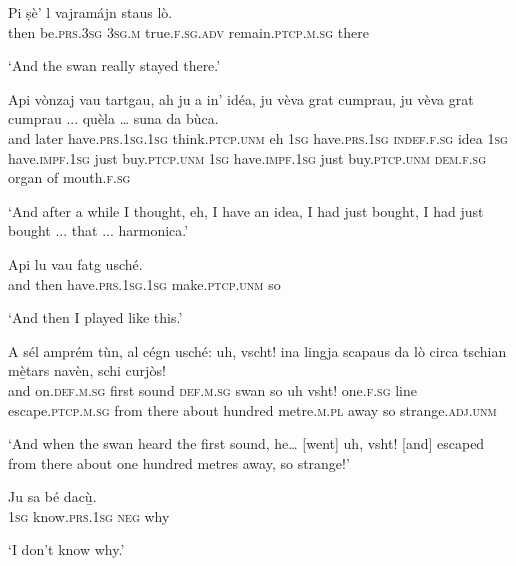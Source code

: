 \begin{linenumbers}
\gll   Pi ṣè’ l vajramájn staus lò. \\
then be.\textsc{prs.3sg} \textsc{3sg.m} true.\textsc{f.sg.adv} remain.\textsc{ptcp.m.sg} there\\
\end{linenumbers}
\medskip
\glt `And the swan really stayed there.'
\medskip

\begin{linenumbers}
\gll Api vònzaj vau tartgau, ah ju a in’ idéa, ju vèva grat cumprau, ju vèva grat cumprau ... quèla … suna da bùca.   \\
and later have.\textsc{prs.1sg.1sg} think.\textsc{ptcp.unm} eh \textsc{1sg} have.\textsc{prs.1sg} \textsc{indef.f.sg} idea \textsc{1sg} have.\textsc{impf.1sg} just buy.\textsc{ptcp.unm}  \textsc{1sg} have.\textsc{impf.1sg} just buy.\textsc{ptcp.unm} {} \textsc{dem.f.sg} {} organ of mouth.\textsc{f.sg} \\
\end{linenumbers}
\medskip
\glt `And after a while I thought, eh, I have an idea, I had just bought, I had just bought ... that ... harmonica.'
\medskip

\begin{linenumbers}
\gll  Api lu vau fatg usché.\footnotemark  \\
and then have.\textsc{prs.1sg.1sg} make.\textsc{ptcp.unm} so \\
\end{linenumbers}
\medskip
\glt `And then I played like this.'
\medskip

\begin{linenumbers}
\gll  A sél amprém tùn, al cégn usché: uh, vscht! ina lingja scapaus da lò circa tschian mè̱tars navèn, schi curjòs!  \\
and on.\textsc{def.m.sg} first sound \textsc{def.m.sg} swan so uh vsht! one.\textsc{f.sg} line escape.\textsc{ptcp.m.sg} from there about hundred metre.\textsc{m.pl} away so strange.\textsc{adj.unm} \\
\end{linenumbers}
\medskip
\glt `And when the swan heard the first sound, he… [went] uh, vsht! [and] escaped from there about one hundred metres away, so strange!'
\medskip

\begin{linenumbers}
\gll Ju sa bé dacù̱.   \\
 \textsc{1sg} know.\textsc{prs.1sg} \textsc{neg} why \\
\end{linenumbers}
\medskip
\glt `I don’t know why.'
\medskip

